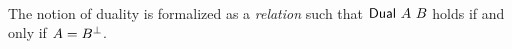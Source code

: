 \begin{code}%
\>[0]\AgdaSpace{}%
\AgdaSpace{}%
\AgdaSymbol{:}\AgdaSpace{}%
\AgdaSpace{}%
\<%
\\
\>[0][@{}l@{\AgdaIndent{0}}]%
\>[2]\AgdaSpace{}%
\AgdaSpace{}%
\AgdaSpace{}%
%
\>[19]\AgdaSymbol{:}\AgdaSpace{}%
\<%
\\
%
\>[2]\AgdaSpace{}%
%
\>[19]\AgdaSymbol{:}\AgdaSpace{}%
\AgdaSpace{}%
\AgdaSpace{}%
\<%
\\
%
\>[2]\AgdaOperator{\AgdaInductiveConstructor{\AgdaUnderscore{}\&\AgdaUnderscore{}}}\AgdaSpace{}%
\AgdaSpace{}%
\AgdaSpace{}%
%
\>[19]\AgdaSymbol{:}\AgdaSpace{}%
\AgdaSpace{}%
\AgdaSpace{}%
\AgdaSpace{}%
\AgdaSpace{}%
\<%
\end{code}

The notion of duality is formalized as a \emph{relation} 
such that $\AgdaDatatype{Dual}~A~B$ holds if and only if $A = B^{\bot}$.

